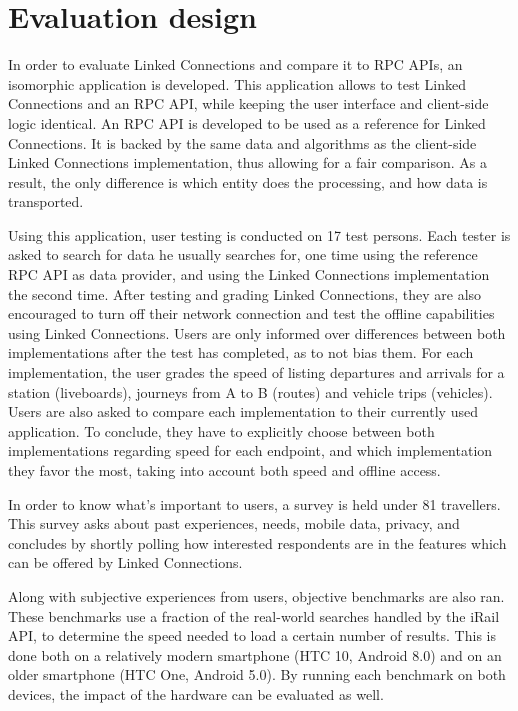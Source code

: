 \documentclass[twocolumn]{phdsymp} %
\begin{document}
\section{Evaluation design}

In order to evaluate Linked Connections and compare it to RPC APIs, an isomorphic application is developed. This application allows to test Linked Connections and an RPC API, while keeping the user interface and client-side logic identical. An RPC API is developed to be used as a reference for Linked Connections. It is backed by the same data and algorithms as the client-side Linked Connections implementation, thus allowing for a fair comparison. As a result, the only difference is which entity does the processing, and how data is transported.

Using this application, user testing is conducted on 17 test persons. Each tester is asked to search for data he usually searches for, one time using the reference RPC API as data provider, and using the Linked Connections implementation the second time. After testing and grading Linked Connections, they are also encouraged to turn off their network connection and test the offline capabilities using Linked Connections.
Users are only informed over differences between both implementations after the test has completed, as to not bias them. For each implementation, the user grades the speed of listing departures and arrivals for a station (liveboards), journeys from A to B (routes) and vehicle trips (vehicles). Users are also asked to compare each implementation to their currently used application. To conclude, they have to explicitly choose between both implementations regarding speed for each endpoint, and which implementation they favor the most, taking into account both speed and offline access. 

In order to know what's important to users, a survey is held under 81 travellers. This survey asks about past experiences, needs, mobile data, privacy, and concludes by shortly polling how interested respondents are in the features which can be offered by Linked Connections.

Along with subjective experiences from users, objective benchmarks are also ran. These benchmarks use a fraction of the real-world searches handled by the iRail API, to determine the speed needed to load a certain number of results. This is done both on a relatively modern smartphone (HTC 10, Android 8.0) and on an older smartphone (HTC One, Android 5.0). By running each benchmark on both devices, the impact of the hardware can be evaluated as well.
\end{document}
